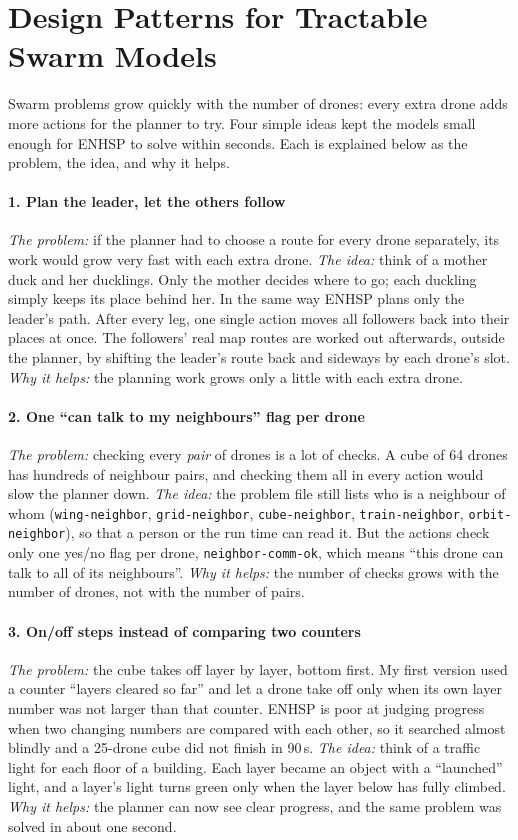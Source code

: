 \documentclass[11pt,a4paper,oneside]{report}
\newcommand{\code}[1]{\texttt{#1}}
\begin{document}
\section{Design Patterns for Tractable Swarm Models}
Swarm problems grow quickly with the number of drones: every extra drone adds more actions for
the planner to try. Four simple ideas kept the models small enough for ENHSP to solve within
seconds. Each is explained below as the problem, the idea, and why it helps.

\paragraph{1. Plan the leader, let the others follow}
\emph{The problem:} if the planner had to choose a route for every drone separately, its work
would grow very fast with each extra drone. \emph{The idea:} think of a mother duck and her
ducklings. Only the mother decides where to go; each duckling simply keeps its place behind her.
In the same way ENHSP plans only the leader's path. After every leg, one single action moves all
followers back into their places at once. The followers' real map routes are worked out
afterwards, outside the planner, by shifting the leader's route back and sideways by each
drone's slot. \emph{Why it helps:} the planning work grows only a little with each extra drone.

\paragraph{2. One ``can talk to my neighbours'' flag per drone}
\emph{The problem:} checking every \emph{pair} of drones is a lot of checks. A cube of 64 drones
has hundreds of neighbour pairs, and checking them all in every action would slow the planner
down. \emph{The idea:} the problem file still lists who is a neighbour of whom
(\code{wing-neighbor}, \code{grid-neighbor}, \code{cube-neighbor}, \code{train-neighbor},
\code{orbit-neighbor}), so that a person or the run time can read it. But the actions check only
one yes/no flag per drone, \code{neighbor-comm-ok}, which means ``this drone can talk to all of
its neighbours''. \emph{Why it helps:} the number of checks grows with the number of drones, not
with the number of pairs.

\paragraph{3. On/off steps instead of comparing two counters}
\emph{The problem:} the cube takes off layer by layer, bottom first. My first version used a
counter ``layers cleared so far'' and let a drone take off only when its own layer number was not
larger than that counter. ENHSP is poor at judging progress when two changing numbers are
compared with each other, so it searched almost blindly and a 25-drone cube did not finish in
90\,s. \emph{The idea:} think of a traffic light for each floor of a building. Each layer became
an object with a ``launched'' light, and a layer's light turns green only when the layer below
has fully climbed. \emph{Why it helps:} the planner can now see clear progress, and the same
problem was solved in about one second.
\end{document}
